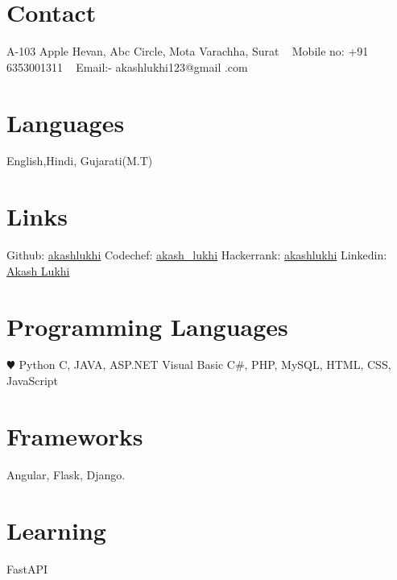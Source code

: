 \documentclass[]{cv-style}
\begin{document}


\begin{aside}
%
\section{Contact}
A-103 Apple Hevan,
Abc Circle, Mota 
Varachha, Surat
~
Mobile no:
+91 6353001311
~
Email:-
akashlukhi123@gmail
.com
%

\section{Languages}
English,Hindi,
Gujarati(M.T)
%


\section{Links}
Github: \href{https://github.com/akashlukhi}{akashlukhi}
Codechef: \href{https://www.codechef.com/users/akash_lukhi}{akash\_lukhi}
Hackerrank: \href{https://www.hackerrank.com/akashlukhi}{akashlukhi}
Linkedin: \href{https://www.linkedin.com/in/akash-lukhi-b0540a213/}{Akash Lukhi}
%

\section{Programming
   Languages}
{\color{red} $\varheartsuit$} Python
C, JAVA, ASP.NET
Visual Basic C\#,
PHP, MySQL, HTML,
CSS, JavaScript
%

\section{Frameworks}
Angular, Flask,
Django.
%
\section{Learning}
FastAPI

\end{aside}



\end{document}
